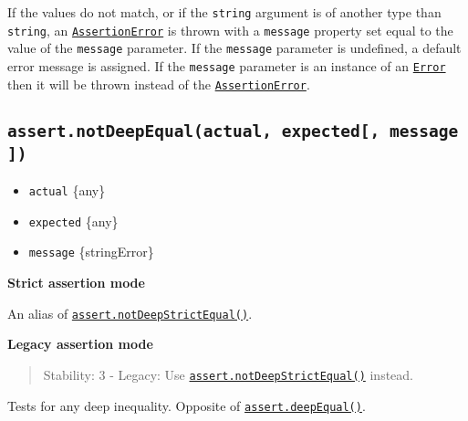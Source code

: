If the values do not match, or if the \texttt{string} argument is of
another type than \texttt{string}, an
\hyperref[class-assertassertionerror]{\texttt{AssertionError}} is thrown
with a \texttt{message} property set equal to the value of the
\texttt{message} parameter. If the \texttt{message} parameter is
undefined, a default error message is assigned. If the \texttt{message}
parameter is an instance of an
\href{errors.md\#class-error}{\texttt{Error}} then it will be thrown
instead of the
\hyperref[class-assertassertionerror]{\texttt{AssertionError}}.

\subsection{\texorpdfstring{\texttt{assert.notDeepEqual(actual,\ expected{[},\ message{]})}}{assert.notDeepEqual(actual, expected{[}, message{]})}}\label{assert.notdeepequalactual-expected-message}

\begin{itemize}
\tightlist
\item
  \texttt{actual} \{any\}
\item
  \texttt{expected} \{any\}
\item
  \texttt{message} \{string\textbar Error\}
\end{itemize}

\textbf{Strict assertion mode}

An alias of
\hyperref[assertnotdeepstrictequalactual-expected-message]{\texttt{assert.notDeepStrictEqual()}}.

\textbf{Legacy assertion mode}

\begin{quote}
Stability: 3 - Legacy: Use
\hyperref[assertnotdeepstrictequalactual-expected-message]{\texttt{assert.notDeepStrictEqual()}}
instead.
\end{quote}

Tests for any deep inequality. Opposite of
\hyperref[assertdeepequalactual-expected-message]{\texttt{assert.deepEqual()}}.

